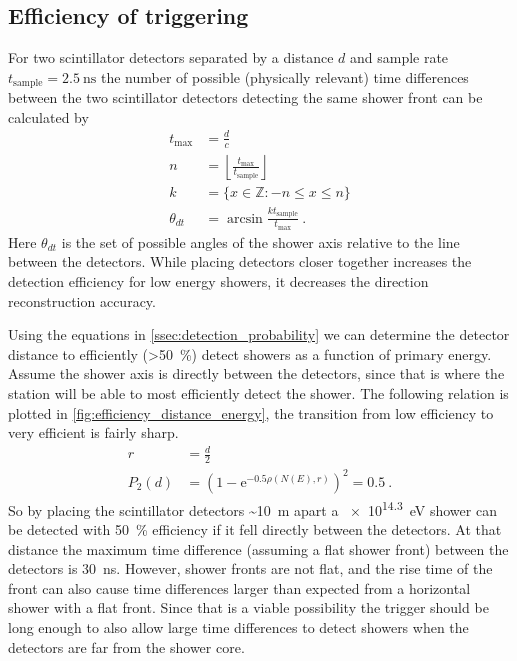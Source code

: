 \subsection{Efficiency of triggering}

For two scintillator detectors separated by a distance $d$ and sample rate $t_{\mathrm{sample}} = \SI{2.5}{\ns}$ the number of possible (physically relevant) time differences between the two scintillator detectors detecting the same shower front can be calculated by
%
\begin{equation}
    \begin{split}
        t_{\mathrm{max}} &= \frac{d}{c} \\
        n &= \left\lfloor \frac{t_{\mathrm{max}}}{t_{\mathrm{sample}}} \right\rfloor \\
        k &= \{x \in \mathbb{Z} : -n \leq x \leq n \} \\
        \theta_{dt} &= \arcsin \frac{k t_{\mathrm{sample}}}{t_{\mathrm{max}}} \ .
    \end{split}
\end{equation}
%
Here $\theta_{dt}$ is the set of possible angles of the shower axis relative to the line between the detectors. While placing detectors closer together increases the detection efficiency for low energy showers, it decreases the direction reconstruction accuracy.

Using the equations in \cref{ssec:detection_probability} we can determine the detector distance to efficiently (\SI{>50}{\percent}) detect showers as a function of primary energy. Assume the shower axis is directly between the detectors, since that is where the station will be able to most efficiently detect the shower. The following relation is plotted in \cref{fig:efficiency_distance_energy}, the transition from low efficiency to very efficient is fairly sharp.
%
\begin{equation}
\begin{split}
    r &= \frac{d}{2} \\
    P_2(d) &= \left(1 - \mathrm{e}^{-0.5 \rho(N(E), r)} \right)^2 = 0.5 \ .
\end{split}
\end{equation}
%
So by placing the scintillator detectors \SI{~10}{\meter} apart a \SI{e14.3}{\eV} shower can be detected with \SI{50}{\percent} efficiency if it fell directly between the detectors. At that distance the maximum time difference (assuming a flat shower front) between the detectors is \SI{30}{\ns}. However, shower fronts are not flat, and the rise time of the front can also cause time differences larger than expected from a horizontal shower with a flat front. Since that is a viable possibility the trigger should be long enough to also allow large time differences to detect showers when the detectors are far from the shower core.

